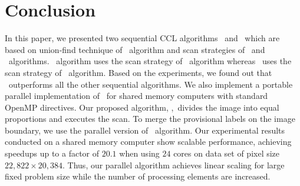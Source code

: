 \vspace{\sectionSpace}
\section{Conclusion}
\label{conclusion}
In this paper, we presented two sequential CCL algorithms \nremsp\ and \aremsp\
which are based on union-find technique of \rems\ algorithm and scan strategies 
of \arun\ and \lrpc\ algorithms. \nremsp\ algorithm uses the scan strategy of
\lrpc\ algorithm whereas \aremsp\ uses the scan strategy of \arun\ algorithm.
Based on the experiments, we found out that \aremsp\ outperforms all the
other sequential algorithms. We also implement a portable parallel
implementation of \aremsp\ for shared memory computers with standard OpenMP
directives.
Our proposed algorithm, \paremsp,\ divides the image into equal proportions and
executes the scan. 
To merge the provisional labels on the image boundary, we use the parallel version of \rems\ algorithm. 
Our experimental results conducted on a shared memory computer show scalable performance, achieving speedups up
to a factor of $20.1$ when using $24$ cores on data set of pixel size $22,822
\times 20, 384$. Thus, our parallel algorithm achieves linear scaling for large
fixed problem size while the number of processing elements are increased.